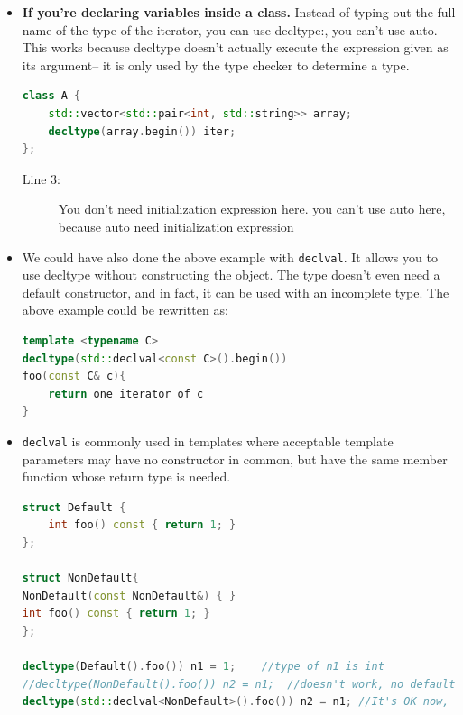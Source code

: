 \documentclass[a4paper,11pt,twoside]{book}
\begin{document}
\begin{itemize}
	\item  \textbf{If you're declaring variables inside a class.} Instead of typing out the full name of the type of the iterator, you can use decltype:, you can't use auto.  This works because decltype doesn't actually execute the expression given as its argument-- it is only used by the type checker to determine a type.
\begin{lstlisting}[frame=single, language=c++, mathescape=true]
class A {
	std::vector<std::pair<int, std::string>> array;
	decltype(array.begin()) iter; 
};
\end{lstlisting}
\begin{description}
	\item[Line 3:] You don't need initialization expression here. you can't use auto here, because auto need initialization expression
\end{description}
	
	\item We could have also done the above example with \texttt{declval}. It allows you to use decltype without constructing the object. The type doesn't even need a default constructor, and in fact, it can be used with an incomplete type. The above example could be rewritten as:
	
\begin{lstlisting}[frame=single, language=c++, mathescape=true]
template <typename C>
decltype(std::declval<const C>().begin())
foo(const C& c){
	return one iterator of c
}
\end{lstlisting}
	
	\item \texttt{declval} is commonly used in templates where acceptable template parameters may have no constructor in common, but have the same member function whose return type is needed.
	
\begin{lstlisting}[frame=single, language=c++]
struct Default {
	int foo() const { return 1; } 
};

struct NonDefault{
NonDefault(const NonDefault&) { }
int foo() const { return 1; }
};
	
decltype(Default().foo()) n1 = 1;    //type of n1 is int
//decltype(NonDefault().foo()) n2 = n1;  //doesn't work, no default ctor
decltype(std::declval<NonDefault>().foo()) n2 = n1; //It's OK now, n2 is int
\end{lstlisting}
	

\end{itemize}
\end{document}
